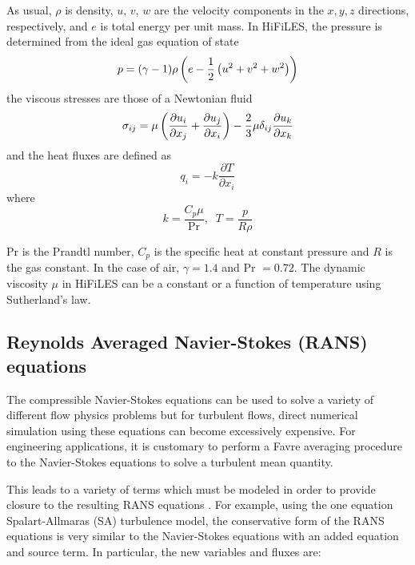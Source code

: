 As usual, $\rho$ is density, $u$, $v$, $w$ are the velocity components in the $x, y, z$ directions, respectively, and $e$ is total energy per unit mass. In HiFiLES, the pressure is determined from the ideal gas equation of state
\begin{equation}
p = (\gamma - 1)\rho\left(e - \frac{1}{2}\left(u^2 + v^2 + w^2\right)\right)
\end{equation}
the viscous stresses are those of a Newtonian fluid
\begin{equation}\label{sigma}
\sigma_{ij} = \mu\left( \frac{\partial u_i}{\partial x_j}
+ \frac{\partial u_j}{\partial x_i} \right)
- \frac{2}{3}\mu \delta_{ij}\frac{\partial u_k}{\partial x_k}
\end{equation}
and the heat fluxes are defined as
\begin{equation}
q_i = -k \frac{\partial T}{\partial x_i}
\end{equation}
where
\begin{equation}
k = \frac{C_p \mu}{\text{Pr}} , \;\; T = \frac{p}{R \rho}
\end{equation}

Pr is the Prandtl number, $C_p$ is the specific heat at constant pressure and $R$ is the gas constant. In the case of air, $\gamma = 1.4$ and Pr $= 0.72$. The dynamic viscosity $\mu$ in HiFiLES can be a constant or a function of temperature using Sutherland's law.

\subsection{Reynolds Averaged Navier-Stokes (RANS) equations}
The compressible Navier-Stokes equations can be used to solve a variety of different flow physics problems but for turbulent flows, direct numerical simulation using these equations can become excessively expensive. For engineering applications, it is customary to perform a Favre averaging procedure to the Navier-Stokes equations to solve a turbulent mean quantity. 

This leads to a variety of terms which must be modeled in order to provide closure to the resulting RANS equations \cite{wilcox1998turbulence,oliver2008high}. For example, using the one equation Spalart-Allmaras (SA) turbulence model, the conservative form of the RANS equations is very similar to the Navier-Stokes equations with an added equation and source term. In particular, the new variables and fluxes are:

